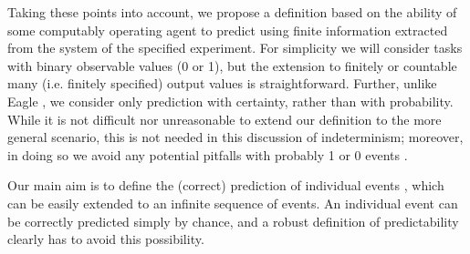 \documentclass[%
 superscriptaddress,
 preprint,
 showpacs,
 showkeys,
 preprintnumbers,
  amsmath,amssymb,
  aps,
 pra,
  longbibliography,
  floatfix,
 ]{revtex4-1}
\theoremstyle{definition}
\begin{document}
Taking these points into account, we propose
a definition based on the ability of some computably operating agent to predict using finite information extracted from the system of the specified experiment.
For simplicity we will consider tasks with binary observable values (0 or 1), but the extension to finitely or countable many (i.e. finitely specified) output values is straightforward.  %
Further, unlike Eagle \cite{Eagle:2005ys}, we consider only prediction with certainty, rather than with probability. %
While it is not difficult nor  unreasonable to extend our definition to the more general scenario, this is not needed
in this discussion of indeterminism; %
moreover,  in doing so we avoid any potential pitfalls with probably 1 or 0 events \cite{Zaman:1987gd}.











Our main aim is to define the (correct) prediction of individual events \cite{Eagle:2005ys}, which can be easily extended to an infinite sequence of events.
An individual event can be correctly predicted simply by chance, and a robust definition of predictability clearly has to  avoid this possibility.
\end{document}
